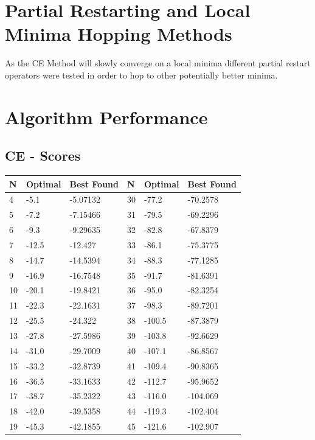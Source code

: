 \documentclass[conference,letterpaper]{IEEEtran}
\begin{document}
\section{Partial Restarting and Local Minima Hopping Methods}
As the CE Method will slowly converge on a local minima different partial restart operators were tested in order to hop to other potentially better minima.

\section{Algorithm Performance}
\subsection{CE - Scores}
\begin{table}[!ht]
    \begin{tabularx}{\columnwidth}{XXXXXX}
    N  & Optimal & Best Found & N  & Optimal & Best Found \\ \hline
    4  & -5.1    & -5.07132   & 30 & -77.2   & -70.2578   \\
    5  & -7.2    & -7.15466   & 31 & -79.5   & -69.2296   \\
    6  & -9.3    & -9.29635   & 32 & -82.8   & -67.8379   \\
    7  & -12.5   & -12.427    & 33 & -86.1   & -75.3775   \\
    8  & -14.7   & -14.5394   & 34 & -88.3   & -77.1285   \\
    9  & -16.9   & -16.7548   & 35 & -91.7   & -81.6391   \\
    10 & -20.1   & -19.8421   & 36 & -95.0   & -82.3254   \\
    11 & -22.3   & -22.1631   & 37 & -98.3   & -89.7201   \\
    12 & -25.5   & -24.322    & 38 & -100.5  & -87.3879   \\
    13 & -27.8   & -27.5986   & 39 & -103.8  & -92.6629   \\
    14 & -31.0   & -29.7009   & 40 & -107.1  & -86.8567   \\
    15 & -33.2   & -32.8739   & 41 & -109.4  & -90.8365   \\
    16 & -36.5   & -33.1633   & 42 & -112.7  & -95.9652   \\
    17 & -38.7   & -35.2322   & 43 & -116.0  & -104.069   \\
    18 & -42.0   & -39.5358   & 44 & -119.3  & -102.404   \\
    19 & -45.3   & -42.1855   & 45 & -121.6  & -102.907   \\

\end{tabularx}
\end{table}
\end{document}
